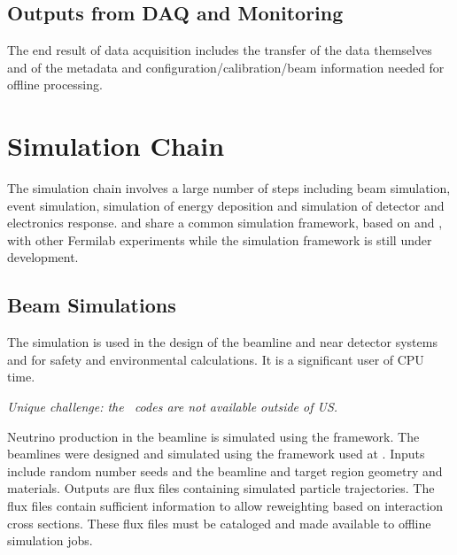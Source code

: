 \documentclass[../main-v1.tex]{subfiles}
\begin{document}
\subsection{Outputs from DAQ and Monitoring}

The end result of data acquisition includes the transfer of the data themselves and of the %
metadata and configuration/calibration/beam information needed for offline processing. 


\section{Simulation Chain }

% 
The  simulation chain involves a large number of steps including beam simulation, event simulation, simulation of energy deposition and simulation of detector and electronics response.  and  share a common simulation framework, based on  and , with other Fermilab  experiments while the  simulation framework is still under development. 



\subsection{Beam Simulations}
The \cite{abs1} simulation is used in the design of the beamline and near detector systems and  for safety and environmental calculations.  It is a significant user of CPU time. 

{\it Unique challenge: the \ codes are not available outside of US.}

Neutrino production in the  
beamline  is simulated using the  framework.  The  beamlines were designed and simulated using the  framework used at \cite{PhysRevAccelBeams.20.111001}.
Inputs include random number seeds and the beamline and target region geometry and materials.  Outputs are flux files containing simulated particle  trajectories.  The flux files contain sufficient information to allow reweighting based on interaction cross sections.  These flux files must be cataloged and made available to offline simulation jobs.
\end{document}
